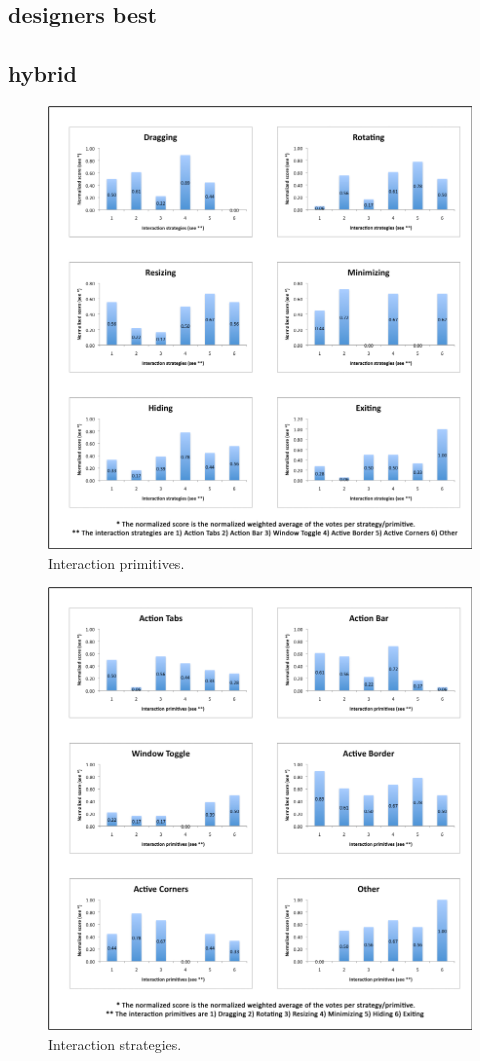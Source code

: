 \subsection{designers best}

\subsection{hybrid}


\begin{figure}[]
  \caption{Interaction primitives.}
  \centering
    \includegraphics[]{images/primHistog}
\end{figure}

\begin{figure}[]
  \caption{Interaction strategies.}
  \centering
    \includegraphics[]{images/stratHistog}
\end{figure}

